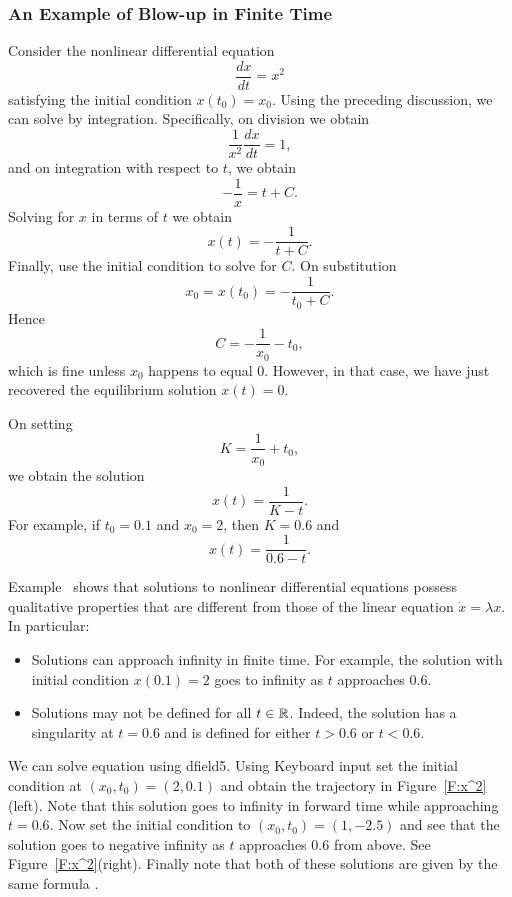 \documentclass{ximera}
\begin{document}
\subsubsection*{An Example of Blow-up in Finite Time}

Consider the nonlinear differential equation
\begin{equation}  \label{e:x^2}
\frac{dx}{dt} = x^2
\end{equation}
satisfying the initial condition $x(t_0)=x_0$.  Using the preceding 
discussion, we can solve  by integration.  Specifically,
on division we obtain
\[
\frac{1}{x^2}\frac{dx}{dt} = 1,
\]
and on integration with respect to $t$, we obtain
\[
-\frac{1}{x} = t + C.
\]
Solving for $x$ in terms of $t$ we obtain
\[
x(t) = - \frac{1}{t+C}.
\]
Finally, use the initial condition to solve for $C$. On substitution 
\[
x_0 = x(t_0) = - \frac{1}{t_0+C}.
\]
Hence
\[
C = -\frac{1}{x_0} - t_0,
\]
which is fine unless $x_0$ happens to equal $0$.  However, in that case, we 
have just recovered the equilibrium solution $x(t)=0$.

On setting
\[
K = \frac{1}{x_0}+t_0,
\]
we obtain the solution
\[
x(t) =  \frac{1}{K-t}.
\]
For example, if $t_0=0.1$ and $x_0=2$, then $K=0.6$ and
\begin{equation} \label{E:solnx^2}
x(t) = \frac{1}{0.6-t}.
\end{equation}

Example~ shows that solutions to nonlinear differential
equations possess 
qualitative properties that are different from 
those of the linear equation $\dot{x}=\lambda x$.  In particular:
\begin{itemize}
\item Solutions can approach infinity in finite time.   For example, 
the solution  with initial condition $x(0.1)=2$ goes to 
infinity as $t$ approaches $0.6$.   
\item Solutions may not be defined for all $t\in\mbox{$\Bbb{R}$}$.  Indeed, the 
solution  has a singularity at $t=0.6$ and is defined 
for either $t> 0.6$ or $t<0.6$.  
\end{itemize}


We can solve equation  using 
{\sf dfield5}.
Using {\sf Keyboard input} set the initial condition at
$(x_0,t_0)=(2,0.1)$ and obtain the trajectory in
Figure~\ref{F:x^2}(left).  Note that this solution goes to infinity
in forward time while approaching $t=0.6$.  Now set the initial
condition to $(x_0,t_0)=(1,-2.5)$ and see that the solution goes
to negative infinity as $t$ approaches $0.6$ from above.  See
Figure~\ref{F:x^2}(right).  Finally note that both of these
solutions are given by the same formula .
\end{document}
